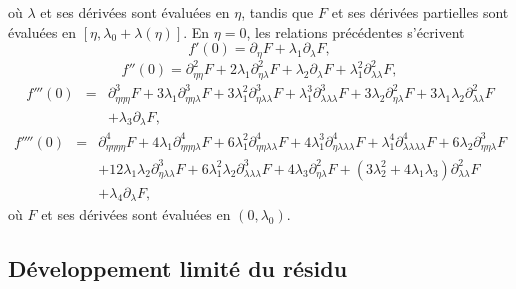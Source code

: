 \documentclass{article}
\begin{document}
où $λ$ et ses dérivées sont évaluées en $η$,
tandis que $F$ et ses dérivées partielles sont évaluées en
$[η, λ_0 + λ (η)]$. En $η = 0$, les relations
précédentes s'écrivent
\begin{equation}
  \label{eq20220107060454} f' (0) = \partial_{η} F + λ_1
  \partial_{λ} F,
\end{equation}
\begin{equation}
  \label{eq20220107124311} f'' (0) = \partial_{η  η}^2 F + 2
  λ_1 \partial_{η  λ}^2 F + λ_2
  \partial_{λ} F + λ_1^2 \partial_{λ  λ}^2 F,
\end{equation}
\begin{eqnarray}
  f''' (0) & = & \partial_{η  η  η}^3 F + 3 λ_1
  \partial_{η  η  λ}^3 F + 3 λ_1^2
  \partial_{η  λ  λ}^3 F + λ_1^3
  \partial_{λ  λ  λ}^3 F + 3 λ_2
  \partial_{η  λ}^2 F + 3 λ_1 λ_2
  \partial_{λ  λ}^2 F \nonumber\\
  &  &  + λ_3 \partial_{λ} F,  \label{eq20220107060500}
\end{eqnarray}
\begin{eqnarray}
  f'''' (0) & = & \partial_{η  η  η  η}^4
  F + 4 λ_1 \partial_{η  η  η
  λ}^4 F + 6 λ_1^2 \partial_{η  η  λ
   λ}^4 F + 4 λ_1^3 \partial_{η  λ
   λ  λ}^4 F + λ_1^4 \partial_{λ
   λ  λ  λ}^4 F + 6 λ_2
  \partial_{η  η  λ}^3 F \nonumber\\
  &  & + 12 λ_1 λ_2 \partial_{η  λ
  λ}^3 F + 6 λ_1^2 λ_2 \partial_{λ  λ
   λ}^3 F + 4 λ_3 \partial_{η  λ}^2 F +
  (3 λ_2^2 + 4 λ_1 λ_3) \partial_{λ
  λ}^2 F \nonumber\\
  &  & + λ_4 \partial_{λ} F,
\end{eqnarray}
où $F$ et ses dérivées sont évaluées en $(0, λ_0)$.

\subsection{Développement limité du
résidu}\label{sec20211112182000}
\end{document}
